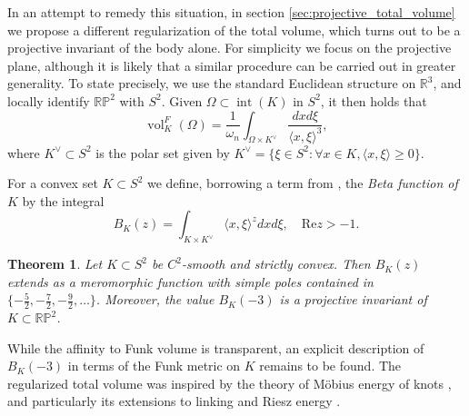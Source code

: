\documentclass[reqno,10pt]{amsart}
\newcounter{mt}
\newcounter{mp}
\newtheorem{MainTheorem}[mt]{Theorem}
\DeclareMathOperator{\inter}{int}
\renewcommand{\Re}{\mathrm {Re}}
\DeclareMathOperator{\vol}{vol}
\newcommand{\R}{\mathbb{R}}
\newcommand{\PP}{\mathbb{P}}
\begin{document}
In an attempt to remedy this situation, in section \ref{sec:projective_total_volume} we propose a different regularization of the total volume, which turns out to be a projective invariant of the body alone. For simplicity we focus on the projective plane, although it is likely that a similar procedure can be carried out in greater generality. To state precisely, we use the standard Euclidean structure on $\R^{3}$, and locally identify $\R\PP^2$ with $S^2$. Given $\Omega\subset \inter(K)$ in $S^2$, it then holds that 
$$\vol^F_K(\Omega)=\frac{1}{\omega_n}\int_{\Omega\times K^\vee}\frac{dxd\xi}{\langle x,\xi\rangle^3},$$
where $K^\vee\subset S^2$ is the polar set given by $K^\vee=\{\xi\in S^2:\forall x\in K, \langle x,\xi\rangle\geq 0\}$.

For a convex set $K\subset S^2$ we define, borrowing a term from \cite{brylinski}, the \emph{Beta function of $K$} by the integral $$B_K(z)=\int_{K\times K^\vee}\langle x,\xi\rangle^zdxd\xi, \quad \Re z>-1.$$

\begin{MainTheorem}\label{main:beta}
	Let $K\subset S^2$ be $C^2$-smooth and strictly convex. Then $B_K(z)$ extends as a meromorphic function with simple poles contained in $\{-\frac52,-\frac72,-\frac 92,\dots\}$. Moreover, the value $B_K(-3)$ is a projective invariant of $K\subset\R\PP^2$.
\end{MainTheorem}
While the affinity to Funk volume is transparent, an explicit description of $B_K(-3)$ in terms of the Funk metric on $K$ remains to be found. The regularized total volume was inspired by the theory of M\"obius energy of knots \cite{ohara_knots}, and particularly its extensions to linking and Riesz energy \cite{ohara_solanes_linking, ohara_solanes_riesz}.
\end{document}
